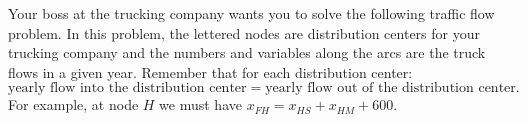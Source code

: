 \begin{lab}
% 
\end{lab}

\begin{lab}
Your boss at the trucking company wants you to solve the following traffic flow problem.
In this problem, the lettered nodes are distribution centers for your trucking company and
the numbers and variables along the arcs are the truck flows in a given year.  Remember
that for each distribution center:
\[ \text{yearly flow into the distribution center} = \text{yearly flow out of the
distribution center}. \]
For example, at node $H$ we must have $x_{FH} = x_{HS}+x_{HM}+600$. 



\begin{center}
\end{center}


\end{lab}
